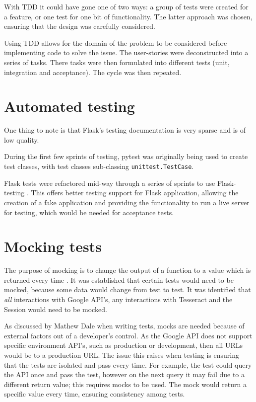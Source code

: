 With TDD it could have gone one of two ways: a group of tests were created for a feature, or one test for one bit of functionality. The latter approach was chosen, ensuring that the design was carefully considered.

Using TDD allows for the domain of the problem to be considered before implementing code to solve the issue. The user-stories were deconstructed into a series of tasks. There tasks were then formulated into different tests (unit, integration and acceptance). The cycle was then repeated.
\section{Automated testing}
One thing to note is that Flask's testing documentation is very sparse and is of low quality.

During the first few sprints of testing, pytest \cite{citeulike:14020583} was originally being used to create test classes, with test classes sub-classing  \lstinline[basicstyle=\normalsize\ttfamily]{unittest.TestCase}.

Flask tests were refactored mid-way through a series of sprints to use Flask-testing \cite{citeulike:14020588}. This offers better testing support for Flask application, allowing the creation of a fake application and providing the functionality to run a live server for testing, which would be needed for acceptance tests.

\section{Mocking tests}
The purpose of mocking is to change the output of a function to a value which is returned every time \cite{citeulike:14020596}. It was established that certain tests would need to be mocked, because some data would change from test to test. It was identified that \textit{all} interactions with Google API's, any interactions with Tesseract and the Session would need to be mocked.

As discussed by Mathew Dale \cite{citeulike:14020597} when writing tests, mocks are needed because of external factors out of a developer's control. As the Google API does not support specific environment API's, such as production or development, then all URLs would be to a production URL. The issue this raises when testing is ensuring that the tests are isolated and pass every time. For example, the test could query the API once and pass the test, however on the next query it may fail due to a different return value; this requires  mocks to be used. The mock would return a specific value every time, ensuring consistency among tests.

